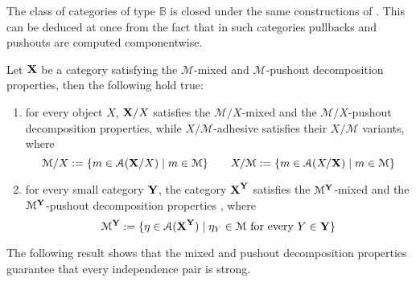 \documentclass[a4paper,UKenglish,cleveref,pdftex, thm-restate,numberwithinsect,anonymous]{lipics}
\def\X{\textbf {\textup{X}}}
\def\Y{\textbf {\textup{Y}}}
\begin{document}
The class of categories of type $\mathbb{B}$ is closed under the same constructions of . This can be deduced at once from the fact that in such categories pullbacks and pushouts are computed componentwise.

\begin{lemma}\label{lem:closed} Let $\X$ be a category satisfying the $\mathcal{M}$-mixed and $\mathcal{M}$-pushout decomposition properties, then the following hold true:
	\begin{enumerate}
		\item  for every object $X$, $\X/X$ satisfies  the $\mathcal{M}/X$-mixed and the $\mathcal{M}/X$-pushout decomposition properties, while $X/\mathcal{M}$-adhesive satisfies their $X/\mathcal{M}$ variants, where
		\[\mathcal{M}/X:=\{m\in \mathcal{A}(\X/X) \mid m\in \mathcal{M} \}
		\qquad X/\mathcal{M}:=\{m\in \mathcal{A}(X/\X) \mid m\in
		\mathcal{M} \}
		\]
		\item  for every small
		category $\Y$, the category $\X^\Y$ satisfies the 
		$\mathcal{M}^{\Y}$-mixed and the $\mathcal{M}^{\Y}$-pushout decomposition properties , where
		\[\mathcal{M}^{\Y}:=\{\eta \in \mathcal{A}(\X^\Y) \mid \eta_Y \in
		\mathcal{M} \text{ for every } Y\in \Y\}\]
	\end{enumerate}
\end{lemma}

The following result shows that the mixed and pushout decomposition properties guarantee that every independence pair is strong.
\end{document}
